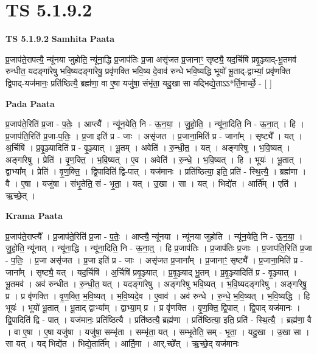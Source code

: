 \documentclass[17pt]{extarticle}
\begin{document}
\section{ TS 5.1.9.2 }

\textbf{TS 5.1.9.2 } \newline
\textbf{Samhita Paata} \newline

प्र॒जाप॑ते॒रापत्यै॒ न्यू॑नया जुहोति॒ न्यू॑ना॒द्धि प्र॒जाप॑तिः प्र॒जा असृ॑जत प्र॒जानाꣳ॒॒ सृष्ट्यै॒ यद॒र्चिषि॑ प्रवृ॒ञ्ज्याद्-भू॒तमव॑ रुन्धीत॒ यदङ्गा॑रेषु भवि॒ष्यदङ्गा॑रेषु॒ प्रवृ॑णक्ति भवि॒ष्य दे॒वाव॑ रुन्धे भवि॒ष्यद्धि भूयो॑ भू॒ताद्-द्वाभ्यां॒ प्रवृ॑णक्ति द्वि॒पाद्-यज॑मानः॒ प्रति॑ष्ठित्यै॒ ब्रह्म॑णा॒ वा ए॒षा यजु॑षा॒ संभृ॑ता॒ यदु॒खा सा यद्भिद्ये॒ताऽऽ*र्ति॒मार्च्छे॒ - [  ] \newline

\textbf{Pada Paata} \newline

प्र॒जाप॑ते॒रिति॑ प्र॒जा - प॒तेः॒ । आप्त्यै᳚ । न्यू॑न॒येति॒ नि - ऊ॒न॒या॒ । जु॒हो॒ति॒ । न्यू॑ना॒दिति॒ नि - ऊ॒ना॒त् । हि । प्र॒जाप॑ति॒रिति॑ प्र॒जा-प॒तिः॒ । प्र॒जा इति॑ प्र - जाः । असृ॑जत । प्र॒जाना॒मिति॑ प्र - जाना᳚म् । सृष्ट्यै᳚ । यत् । अ॒र्चिषि॑ । प्र॒वृ॒ञ्ज्यादिति॑ प्र - वृ॒ञ्ज्यात् । भू॒तम् । अवेति॑ । रु॒न्धी॒त॒ । यत् । अङ्गा॑रेषु । भ॒वि॒ष्यत् । अङ्गा॑रेषु । प्रेति॑ । वृ॒ण॒क्ति॒ । भ॒वि॒ष्यत् । ए॒व । अवेति॑ । रु॒न्धे॒ । भ॒वि॒ष्यत् । हि । भूयः॑ । भू॒तात् । द्वाभ्या᳚म् । प्रेति॑ । वृ॒ण॒क्ति॒ । द्वि॒पादिति॑ द्वि-पात् । यज॑मानः । प्रति॑ष्ठित्या॒ इति॒ प्रति॑ - स्थि॒त्यै॒ । ब्रह्म॑णा । वै । ए॒षा । यजु॑षा । संभृ॒तेति॒ सं - भृ॒ता॒ । यत् । उ॒खा । सा । यत् । भिद्ये॑त । आर्ति᳚म् । एति॑ । ऋ॒च्छे॒त् ।  \newline


\textbf{Krama Paata} \newline

प्र॒जाप॑ते॒राप्त्यै᳚ । प्र॒जाप॑ते॒रिति॑ प्र॒जा - प॒तेः॒ । आप्त्यै॒ न्यू॑नया । न्यू॑नया जुहोति । न्यू॑न॒येति॒ नि - ऊ॒न॒या॒ । जु॒हो॒ति॒ न्यू॑नात् । न्यू॑ना॒द्धि । न्यू॑ना॒दिति॒ नि - ऊ॒ना॒त्॒ । हि प्र॒जाप॑तिः । प्र॒जाप॑तिः प्र॒जाः । प्र॒जाप॑ति॒रिति॑ प्र॒जा - प॒तिः॒ । प्र॒जा असृ॑जत । प्र॒जा इति॑ प्र - जाः । असृ॑जत प्र॒जाना᳚म् । प्र॒जानाꣳ॒॒ सृष्ट्यै᳚ । प्र॒जाना॒मिति॑ प्र - जाना᳚म् । सृष्ट्यै॒ यत् । यद॒र्चिषि॑ । अ॒र्चिषि॑ प्रवृ॒ञ्ज्यात् । प्र॒वृ॒ञ्ज्याद् भू॒तम् । प्र॒वृ॒ञ्ज्यादिति॑ प्र - वृ॒ञ्ज्यात् । भू॒तमव॑ । अव॑ रुन्धीत । रु॒न्धी॒त॒ यत् । यदङ्गा॑रेषु । अङ्गा॑रेषु भवि॒ष्यत् । भ॒वि॒ष्यदङ्गा॑रेषु । अङ्गा॑रेषु॒ प्र । प्र वृ॑णक्ति । वृ॒ण॒क्ति॒ भ॒वि॒ष्यत् । भ॒वि॒ष्यदे॒व । ए॒वाव॑ । अव॑ रुन्धे । रु॒न्धे॒ भ॒वि॒ष्यत् । भ॒वि॒ष्यद्धि । हि भूयः॑ । भूयो॑ भू॒तात् । भू॒ताद् द्वाभ्या᳚म् । द्वाभ्या॒म् प्र । प्र वृ॑णक्ति । वृ॒ण॒क्ति॒ द्वि॒पात् । द्वि॒पाद् यज॑मानः । द्वि॒पादिति॑ द्वि - पात् । यज॑मानः॒ प्रति॑ष्ठित्यै । प्रति॑ष्ठत्यै॒ ब्रह्म॑णा । प्रति॑ष्ठित्या॒ इति॒ प्रति॑ - स्थि॒त्यै॒ । ब्रह्म॑णा॒ वै । वा ए॒षा । ए॒षा यजु॑षा । यजु॑षा॒ सम्भृ॑ता । सम्भृ॑ता॒ यत् । सम्भृ॒तेति॒ सम् - भृ॒ता॒ । यदु॒खा । उ॒खा सा । सा यत् । यद् भिद्ये॑त । भिद्ये॒तार्ति᳚म् । आर्ति॒मा । आर्.च्छे᳚त् । ऋ॒च्छे॒द् यज॑मानः \newline
\end{document}

